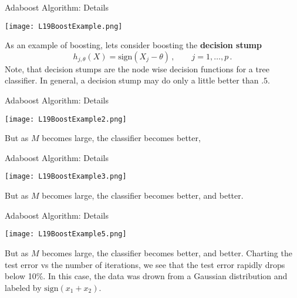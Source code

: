 \documentclass[10pt, table, dvipsnames,xcdraw, handout]{beamer}
\begin{document}
\begin{frame}[fragile]{Adaboost Algorithm: Details}
  \begin{minipage}[t][0.5\textheight][t]{\textwidth}
	\centering \texttt{[image: L19BoostExample.png]} 
  \end{minipage}
  \vfill
\begin{minipage}[t][0.5\textheight][t]{\textwidth}
As an example of boosting, lets consider boosting the \textbf{decision stump}
$$
h_{j,\theta}(X) = \text{sign}(X_j - \theta)\,,\hspace{2em} j  =  1,\ldots, p\,.
$$\pause
Note, that decision stumps are the node wise decision functions for a tree classifier. \pause In general, a decision stump may do only a little better than $.5$.
\end{minipage}
\end{frame}


\begin{frame}[fragile]{Adaboost Algorithm: Details}
  \begin{minipage}[t][0.5\textheight][t]{\textwidth}
	\centering \texttt{[image: L19BoostExample2.png]} 
  \end{minipage}
  \vfill
\begin{minipage}[t][0.5\textheight][t]{\textwidth}
But as $M$ becomes large, the classifier becomes better,
\end{minipage}
\end{frame}


\begin{frame}[fragile]{Adaboost Algorithm: Details}
  \begin{minipage}[t][0.5\textheight][t]{\textwidth}
	\centering \texttt{[image: L19BoostExample3.png]} 
  \end{minipage}
  \vfill
\begin{minipage}[t][0.5\textheight][t]{\textwidth}
But as $M$ becomes large, the classifier becomes better, and better.
\end{minipage}
\end{frame}


\begin{frame}[fragile]{Adaboost Algorithm: Details}
  \begin{minipage}[t][0.5\textheight][t]{\textwidth}
	\centering \texttt{[image: L19BoostExample5.png]} 
  \end{minipage}
  \vfill
\begin{minipage}[t][0.5\textheight][t]{\textwidth}
But as $M$ becomes large, the classifier becomes better, and better. Charting the test error vs the number of iterations, we see that the test error rapidly drops below 10\%. In this case, the data was drown from a Gaussian distribution and labeled by $\text{sign}(x_1 + x_2)$.
\end{minipage}
\end{frame}
\end{document}
